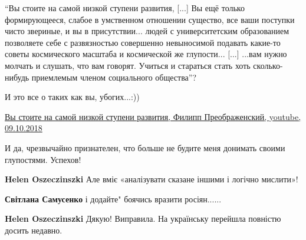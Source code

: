 \begin{itemize}
\begin{itemize}
\enquote{Вы стоите на самой низкой ступени развития, [...] Вы ещё только формирующееся,
слабое в умственном отношении существо, все ваши поступки чисто звериные, и вы
в присутствии... людей с университетским образованием позволяете себе с
развязностью совершенно невыносимой подавать какие-то советы космического
масштаба и космической же глупости... [...] ...вам нужно молчать и слушать, что вам
говорят. Учиться и стараться стать хоть сколько-нибудь приемлемым членом
социального общества}?

И это все о таких как вы, убогих...:))

\href{https://www.youtube.com/watch?app=desktop&v=Wm2nN9hfxoY}{%
Вы стоите на самой низкой ступени развития, Филипп Преображенский, youtube, 09.10.2018%
}

И да, чрезвычайно признателен, что больше не будите меня донимать своими глупостями. Успехов!

 
\textbf{Helen Oszeczinszki} Але вміє «аналізувати сказане іншими і логічно мислити»!

 
\textbf{Світлана Самусенко} і додайте" боячись вразити росіян......

 
\textbf{Helen Oszeczinszki} Дякую! Виправила. На українську перейшла повністю досить недавно.

\end{itemize}

 


\end{itemize}
